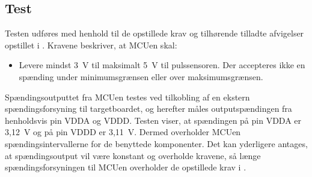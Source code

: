 \subsection{Test}
Testen udføres med henhold til de opstillede krav og tilhørende tilladte afvigelser opstillet i . Kravene beskriver, at MCUen skal:
\begin{itemize}
	\item Levere mindst 3~V til maksimalt 5~V til pulssensoren. Der accepteres ikke en spænding under minimumsgrænsen eller over maksimumsgrænsen.
\end{itemize}

Spændingsoutputtet fra MCUen testes ved tilkobling af en ekstern spændingsforsyning til targetboardet, og herefter måles outputspændingen fra henholdsvis pin VDDA og VDDD.  \newline
Testen viser, at spændingen på pin VDDA er 3,12~V og på pin VDDD er 3,11~V. Dermed overholder MCUen spændingsintervallerne for de benyttede komponenter. Det kan yderligere antages, at spændingsoutput vil være konstant og overholde kravene, så længe spændingsforsyningen til MCUen overholder de opstillede krav i .

